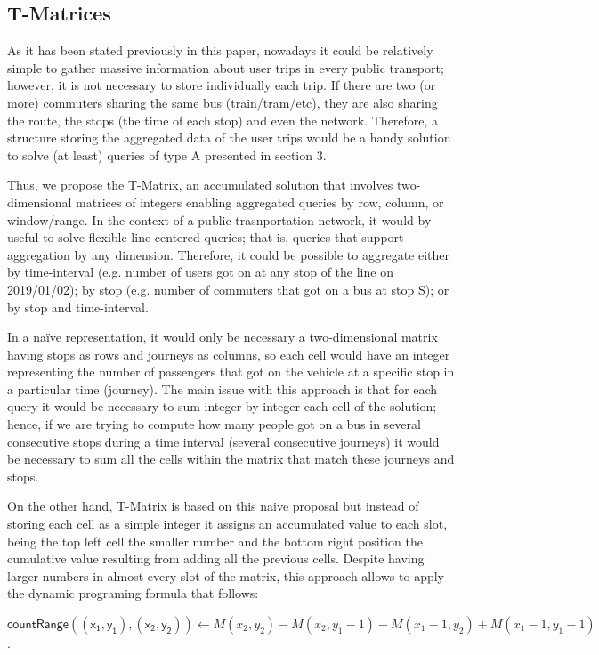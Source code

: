 \documentclass[runningheads]{llncs}
\newcommand{\acumm}{T-Matrices} %
\begin{document}
\subsection{\acumm}
\label{sec:acumm}
As it has been stated previously in this paper, nowadays it could be relatively simple to gather massive information about user trips in every public transport; however, it is not necessary to store individually each trip. If there are two (or more) commuters sharing the same bus (train/tram/etc), they are also sharing the route, the stops (the time of each stop) and even the network. Therefore, a structure storing the aggregated data of the user trips would be a handy solution to solve (at least) queries of type A presented in section 3.

Thus, we propose the T-Matrix, an accumulated solution that involves two-dimensional matrices of integers enabling aggregated queries by row, column, or window/range. In the context of a public trasnportation network, it would by useful to solve flexible line-centered queries; that is, queries that support aggregation by any dimension. Therefore, it could be possible to aggregate either by time-interval (e.g. number of users got on at any stop of the line on 2019/01/02); by stop (e.g. number of commuters that got on a bus at stop S); or by stop and time-interval.

In a naïve representation, it would only be necessary a two-dimensional matrix having stops as rows and journeys as columns, so each cell would have an integer representing the number of passengers that got on the vehicle at a specific stop in a particular time (journey). The main issue with this approach is that for each query it would be necessary to sum integer by integer each cell of the solution; hence, if we are trying to compute how many people got on a bus in several consecutive stops during a time interval (several consecutive journeys) it would be necessary to sum all the cells within the matrix that match these journeys and stops.

On the other hand, T-Matrix is based on this naive proposal but instead of storing each cell as a simple integer it assigns an accumulated value to each slot, being the top left cell the smaller number and the bottom right position the cumulative value resulting from adding all the previous cells. Despite having larger numbers in almost every slot of the matrix, this approach allows to apply the dynamic programing formula that follows:

$\mathsf{countRange((x_1,y_1),(x_2,y_2))} \leftarrow {M(x_2,y_2)} - {M(x_2,y_1-1)} - {M(x_1-1,y_2)} + {M(x_1-1,y_1-1)}$.
\end{document}

